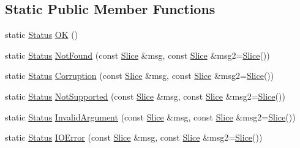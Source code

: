 \subsection*{Static Public Member Functions}
\begin{DoxyCompactItemize}
\item 
static \hyperlink{classleveldb_1_1_status}{Status} \hyperlink{classleveldb_1_1_status_a8e3720d233281c874a53c17e081f51b3}{O\+K} ()
\item 
static \hyperlink{classleveldb_1_1_status}{Status} \hyperlink{classleveldb_1_1_status_a9e5beb5b2e758f041e0c012426e7b1b8}{Not\+Found} (const \hyperlink{classleveldb_1_1_slice}{Slice} \&msg, const \hyperlink{classleveldb_1_1_slice}{Slice} \&msg2=\hyperlink{classleveldb_1_1_slice}{Slice}())
\item 
static \hyperlink{classleveldb_1_1_status}{Status} \hyperlink{classleveldb_1_1_status_a755b1ee5b0029cf9ea1128f1cdff5855}{Corruption} (const \hyperlink{classleveldb_1_1_slice}{Slice} \&msg, const \hyperlink{classleveldb_1_1_slice}{Slice} \&msg2=\hyperlink{classleveldb_1_1_slice}{Slice}())
\item 
static \hyperlink{classleveldb_1_1_status}{Status} \hyperlink{classleveldb_1_1_status_a66c6b7171cedb55651e34e5df9a14705}{Not\+Supported} (const \hyperlink{classleveldb_1_1_slice}{Slice} \&msg, const \hyperlink{classleveldb_1_1_slice}{Slice} \&msg2=\hyperlink{classleveldb_1_1_slice}{Slice}())
\item 
static \hyperlink{classleveldb_1_1_status}{Status} \hyperlink{classleveldb_1_1_status_aefef9f88d0a6ca6d34bd9dec1670309e}{Invalid\+Argument} (const \hyperlink{classleveldb_1_1_slice}{Slice} \&msg, const \hyperlink{classleveldb_1_1_slice}{Slice} \&msg2=\hyperlink{classleveldb_1_1_slice}{Slice}())
\item 
static \hyperlink{classleveldb_1_1_status}{Status} \hyperlink{classleveldb_1_1_status_ada6143081d41803808f77287153f96b7}{I\+O\+Error} (const \hyperlink{classleveldb_1_1_slice}{Slice} \&msg, const \hyperlink{classleveldb_1_1_slice}{Slice} \&msg2=\hyperlink{classleveldb_1_1_slice}{Slice}())
\end{DoxyCompactItemize}
